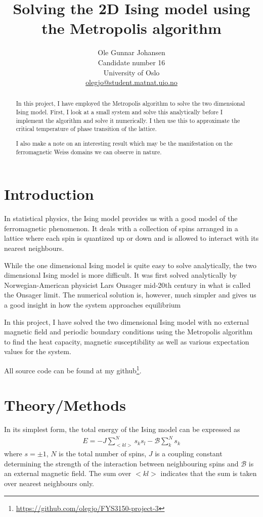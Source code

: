 \documentclass[twoside, 11pt]{article}
\title{\vspace{-15mm}\fontsize{16pt}{13pt}\selectfont\textbf{Solving the 2D Ising model using the Metropolis algorithm}} %
\author{
\large
Ole Gunnar Johansen\\[0mm]%
Candidate number 16 \\
\normalsize University of Oslo \\[0mm] %
\normalsize \href{mailto:olegjo@ulrik.uio.no}{olegjo@student.matnat.uio.no} %
\vspace{5mm}
}
\date{}
\begin{document}
\maketitle %
\thispagestyle{fancy} %


\begin{abstract}

\noindent
In this project, I have employed the Metropolis algorithm to solve the two dimensional Ising model. First, I look at a small system and solve this analytically before I implement the algorithm and solve it numerically. I then use this to approximate the critical temperature of phase transition of the lattice.

I also make a note on an interesting result which may be the manifestation on the ferromagnetic Weiss domains we can observe in nature. 

\end{abstract}


\section{Introduction}
	In statistical physics, the Ising model provides us with a good model of the ferromagnetic phenomenon. It deals with a collection of spins arranged in a lattice where each spin is quantized up or down and is allowed to interact with its nearest neighbours. 

	While the one dimensional Ising model is quite easy to solve analytically, the two dimensional Ising model is more difficult. It was first solved analytically by Norwegian-American physicist Lars Onsager mid-20th century in what is called the Onsager limit. The numerical solution is, however, much simpler and gives us a good insight in how the system approaches equilibrium
	
	In this project, I have solved the two dimensional Ising model with no external magnetic field and periodic boundary conditions using the Metropolis algorithm to find the heat capacity, magnetic susceptibility as well as various expectation values for the system.
	

	
	All source code can be found at my github\footnote{\url{https://github.com/olegjo/FYS3150-project-3}}.

\section{Theory/Methods}
	In its simplest form, the total energy of the Ising model can be expressed as
	\begin{align}
		E = -J \sum_{<kl>}^N s_ks_l - \mathcal{B}\sum_k^N s_k
	\end{align}
	where $s = \pm 1$, $N$ is the total number of spins, $J$ is a coupling constant determining the strength of the interaction between neighbouring spins and $\mathcal{B}$ is an external magnetic field. The sum over $<kl>$ indicates that the sum is taken over nearest neighbours only. 
	
\end{document}
